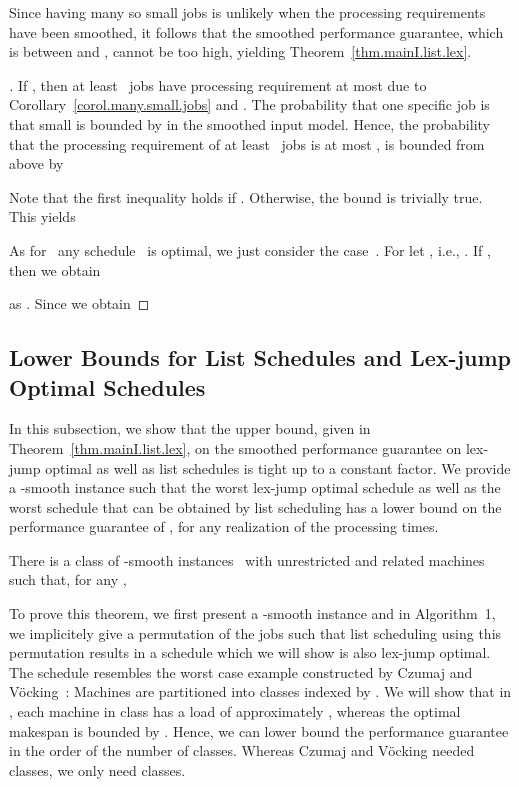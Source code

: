 \documentclass[a4paper,11pt,fleqn]{article}
\begin{document}
Since having many so small jobs is unlikely when the processing
requirements have been smoothed, it follows that the smoothed
performance guarantee, which is between  and , cannot be too high, yielding Theorem~\ref{thm.mainI.list.lex}.

\begin{proof}[]
If , then at least~ jobs have processing requirement at most  due to Corollary~\ref{corol.many.small.jobs} and . The probability that one specific job is that small is bounded by  in the smoothed input model. Hence, the probability that the processing requirement of at least~ jobs is at most , is bounded from above by

Note that the first inequality holds if . Otherwise, the bound is trivially true. This yields

As for~ any schedule~ is optimal, we just consider the case~. For  let , i.e., . If , then we obtain

as . Since  we obtain

\end{proof}





\subsection{Lower Bounds for List Schedules and Lex-jump Optimal Schedules}
\label{subsec:lb-list-lex-jump}


In this subsection, we show that the upper bound,
given in Theorem~\ref{thm.mainI.list.lex},
on the smoothed performance guarantee on  lex-jump optimal as well as list schedules is tight up to a constant factor.
We provide a -smooth instance such that the worst lex-jump optimal schedule as well as the worst schedule that can be obtained by list scheduling has a lower bound on the performance guarantee of , for any realization of the processing times.

\begin{theorem}
\label{thm.mainII.list.lex}
There is a class of -smooth instances~ with unrestricted and related machines such that, for any ,

\end{theorem}



To prove this theorem, we first present a -smooth instance and in
Algorithm~1, we implicitely give a permutation of the jobs such that list
scheduling using this permutation results in a schedule  which
we will show is also lex-jump optimal. The schedule  resembles
the worst case example constructed by Czumaj and
V\"{o}cking~\cite{Voecking:2007}: Machines are partitioned into classes
indexed by . We will show that in , each machine
in class  has a load of approximately , whereas the optimal
makespan is bounded by . Hence, we can lower bound the performance
guarantee in the order of the number of classes. Whereas Czumaj and
V\"{o}cking needed  classes, we only need
 classes.
\end{document}

